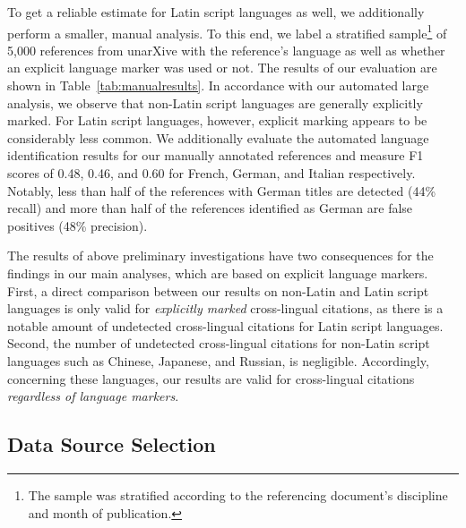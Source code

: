 To get a reliable estimate for Latin script languages as well, we additionally perform a smaller, manual analysis. To this end, we label a stratified sample\footnote{The sample was stratified according to the referencing document's discipline and month of publication.} of 5,000 references from unarXive with the reference's language as well as whether an explicit language marker was used or not. The results of our evaluation are shown in Table~\ref{tab:manualresults}.
In accordance with our automated large analysis, we observe that non-Latin script languages are generally explicitly marked. For Latin script languages, however, explicit marking appears to be considerably less common. We additionally evaluate the automated language identification results for our manually annotated references and measure F1 scores of 0.48, 0.46, and 0.60 for French, German, and Italian respectively. Notably, less than half of the references with German titles are detected (44\% recall) and more than half of the references identified as German are false positives (48\% precision).

The results of above preliminary investigations have two consequences for the findings in our main analyses, which are based on explicit language markers. First, a direct comparison between our results on non-Latin and Latin script languages is only valid for \emph{explicitly marked} cross-lingual citations, as there is a notable amount of undetected cross-lingual citations for Latin script languages. Second, the number of undetected cross-lingual citations for non-Latin script languages such as Chinese, Japanese, and Russian, is negligible. Accordingly, concerning these languages, our results are valid for cross-lingual citations \emph{regardless of language markers}.

\subsection{Data Source Selection}\label{sec:dataselect}

